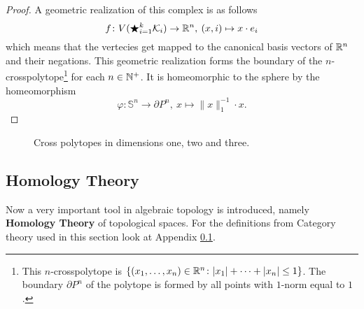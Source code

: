 \begin{proof}
  A geometric realization of this complex is as follows
  \begin{equation*}
    f\colon V(\bigstar_{i=1}^k \mathcal{K}_i) \to \mathbb{R}^n, \: (x, i) \mapsto x \cdot e_i
  \end{equation*}
  which means that the vertecies get mapped to the canonical basis vectors of $\mathbb{R}^n$ and their negations. 
  This geometric realization forms the boundary of the $n$-crosspolytope\footnote{This $n$-crosspolytope is $\{(x_1, \ldots, x_n) \in \mathbb{R}^n\colon |x_1| + \cdots + |x_n| \leq 1 \}$. The boundary $\partial P^n$ of the polytope is formed by all points with $1$-norm equal to $1$.} for each $n \in \mathbb{N}^+$. It is homeomorphic to the sphere by the homeomorphism
  \begin{equation*}
    \varphi\colon \mathbb{S}^n \to \partial P^n, \: x \mapsto \lVert x \rVert_1^{-1} \cdot x. 
  \end{equation*}
\end{proof}

\begin{figure}[ht!]
  \centering
  \caption{Cross polytopes in dimensions one, two and three.}
  \label{fig:cross}
\end{figure}

\subsection{Homology Theory}
Now a very important tool in algebraic topology is introduced, namely \textbf{Homology Theory} of topological spaces. For the definitions from Category theory used in this section look at Appendix \ref{}. 

